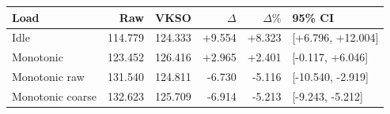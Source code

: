 \begin{tabular}{lrrrrl}
\toprule
Load & Raw & VKSO & $\Delta$ & $\Delta\%$ & 95\% CI \\
\midrule
Idle & 114.779 & 124.333 & +9.554 & +8.323 & [+6.796, +12.004] \\
Monotonic & 123.452 & 126.416 & +2.965 & +2.401 & [-0.117, +6.046] \\
Monotonic raw & 131.540 & 124.811 & -6.730 & -5.116 & [-10.540, -2.919] \\
Monotonic coarse & 132.623 & 125.709 & -6.914 & -5.213 & [-9.243, -5.212] \\
\bottomrule
\end{tabular}

